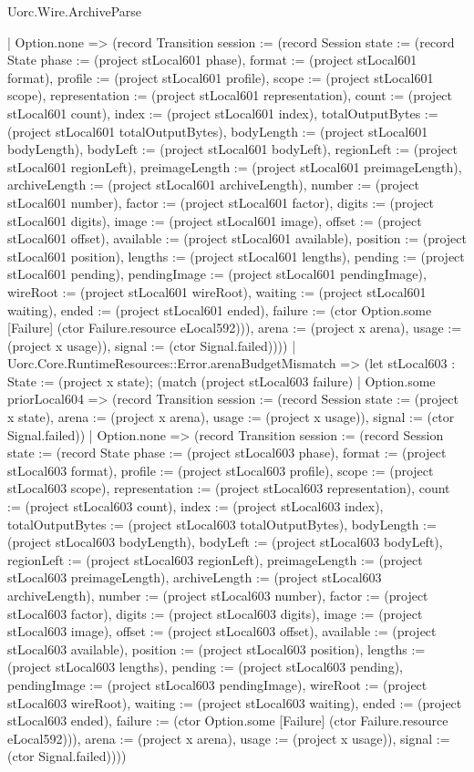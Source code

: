 \begin{lexlean}{Uorc.Wire.ArchiveParse}
\begin{semanticmodule}
{        | Option.none => (record Transition {session := (record Session {state := (record State {phase := (project stLocal601 phase), format := (project stLocal601 format), profile := (project stLocal601 profile), scope := (project stLocal601 scope), representation := (project stLocal601 representation), count := (project stLocal601 count), index := (project stLocal601 index), totalOutputBytes := (project stLocal601 totalOutputBytes), bodyLength := (project stLocal601 bodyLength), bodyLeft := (project stLocal601 bodyLeft), regionLeft := (project stLocal601 regionLeft), preimageLength := (project stLocal601 preimageLength), archiveLength := (project stLocal601 archiveLength), number := (project stLocal601 number), factor := (project stLocal601 factor), digits := (project stLocal601 digits), image := (project stLocal601 image), offset := (project stLocal601 offset), available := (project stLocal601 available), position := (project stLocal601 position), lengths := (project stLocal601 lengths), pending := (project stLocal601 pending), pendingImage := (project stLocal601 pendingImage), wireRoot := (project stLocal601 wireRoot), waiting := (project stLocal601 waiting), ended := (project stLocal601 ended), failure := (ctor Option.some [Failure] (ctor Failure.resource eLocal592))}), arena := (project x arena), usage := (project x usage)}), signal := (ctor Signal.failed)})))
      | Uorc.Core.RuntimeResources::Error.arenaBudgetMismatch => (let stLocal603 : State := (project x state); (match (project stLocal603 failure)
        | Option.some priorLocal604 => (record Transition {session := (record Session {state := (project x state), arena := (project x arena), usage := (project x usage)}), signal := (ctor Signal.failed)})
        | Option.none => (record Transition {session := (record Session {state := (record State {phase := (project stLocal603 phase), format := (project stLocal603 format), profile := (project stLocal603 profile), scope := (project stLocal603 scope), representation := (project stLocal603 representation), count := (project stLocal603 count), index := (project stLocal603 index), totalOutputBytes := (project stLocal603 totalOutputBytes), bodyLength := (project stLocal603 bodyLength), bodyLeft := (project stLocal603 bodyLeft), regionLeft := (project stLocal603 regionLeft), preimageLength := (project stLocal603 preimageLength), archiveLength := (project stLocal603 archiveLength), number := (project stLocal603 number), factor := (project stLocal603 factor), digits := (project stLocal603 digits), image := (project stLocal603 image), offset := (project stLocal603 offset), available := (project stLocal603 available), position := (project stLocal603 position), lengths := (project stLocal603 lengths), pending := (project stLocal603 pending), pendingImage := (project stLocal603 pendingImage), wireRoot := (project stLocal603 wireRoot), waiting := (project stLocal603 waiting), ended := (project stLocal603 ended), failure := (ctor Option.some [Failure] (ctor Failure.resource eLocal592))}), arena := (project x arena), usage := (project x usage)}), signal := (ctor Signal.failed)})))
}
\end{semanticmodule}
\end{lexlean}
